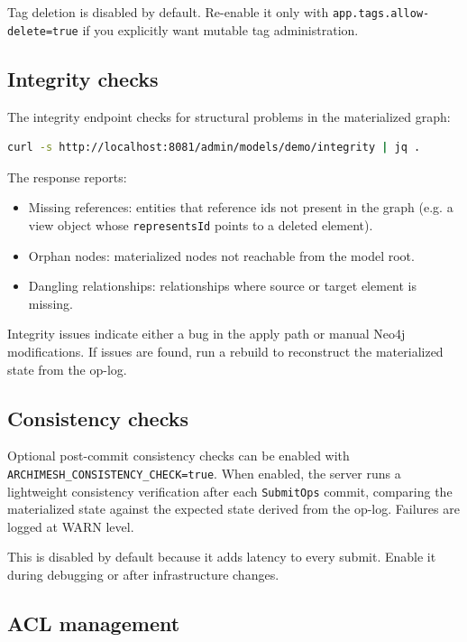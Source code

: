 Tag deletion is disabled by default. Re-enable it only with
\texttt{app.tags.allow-delete=true} if you explicitly want mutable tag
administration.

\subsection{Integrity checks}

The integrity endpoint checks for structural problems in the materialized
graph:

\begin{lstlisting}[language=bash,caption={Check integrity}]
curl -s http://localhost:8081/admin/models/demo/integrity | jq .
\end{lstlisting}

The response reports:

\begin{itemize}
\item Missing references: entities that reference ids not present in the
  graph (e.g. a view object whose \texttt{representsId} points to a deleted
  element).
\item Orphan nodes: materialized nodes not reachable from the model root.
\item Dangling relationships: relationships where source or target element
  is missing.
\end{itemize}

Integrity issues indicate either a bug in the apply path or manual Neo4j
modifications. If issues are found, run a rebuild to reconstruct the
materialized state from the op-log.

\subsection{Consistency checks}

Optional post-commit consistency checks can be enabled with
\texttt{ARCHIMESH\_CONSISTENCY\_CHECK=true}. When enabled, the server runs
a lightweight consistency verification after each \texttt{SubmitOps}
commit, comparing the materialized state against the expected state derived
from the op-log. Failures are logged at WARN level.

This is disabled by default because it adds latency to every submit.
Enable it during debugging or after infrastructure changes.

\subsection{ACL management}

